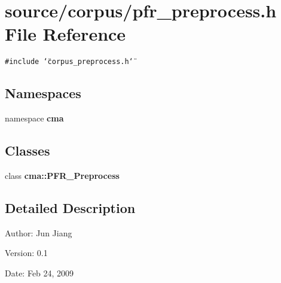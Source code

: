 \section{source/corpus/pfr\_\-preprocess.h File Reference}
\label{pfr__preprocess_8h}
{\tt \#include \char`\"{}corpus\_\-preprocess.h\char`\"{}}\par
\subsection*{Namespaces}
\begin{CompactItemize}
\item 
namespace \textbf{cma}
\end{CompactItemize}
\subsection*{Classes}
\begin{CompactItemize}
\item 
class {\bf cma::PFR\_\-Preprocess}
\end{CompactItemize}


\subsection{Detailed Description}
\begin{Desc}
\item[Author:]Jun Jiang \end{Desc}
\begin{Desc}
\item[Version:]0.1 \end{Desc}
\begin{Desc}
\item[Date:]Feb 24, 2009 \end{Desc}
